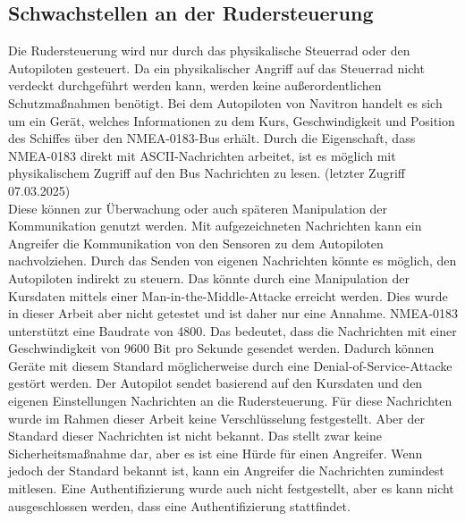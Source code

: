 \subsection{Schwachstellen an der Rudersteuerung}
Die Rudersteuerung wird nur durch das physikalische Steuerrad oder den Autopiloten gesteuert. Da ein physikalischer
Angriff auf das Steuerrad nicht verdeckt durchgeführt werden kann, werden keine außerordentlichen Schutzmaßnahmen benötigt.
Bei dem Autopiloten von Navitron handelt es sich um ein Gerät, welches Informationen zu dem Kurs, Geschwindigkeit und
Position des Schiffes über den NMEA-0183-Bus erhält. Durch die Eigenschaft, dass NMEA-0183 direkt mit ASCII-Nachrichten
arbeitet, ist es möglich mit physikalischem Zugriff auf den Bus Nachrichten zu lesen. \cite{nmea0183} (letzter Zugriff 07.03.2025) \\
Diese können zur Überwachung oder auch späteren Manipulation der Kommunikation genutzt werden. Mit aufgezeichneten Nachrichten
kann ein Angreifer die Kommunikation von den Sensoren zu dem Autopiloten nachvolziehen. Durch das Senden von eigenen Nachrichten
könnte es möglich, den Autopiloten indirekt zu steuern. Das könnte durch eine Manipulation der Kursdaten mittels einer Man-in-the-Middle-Attacke
erreicht werden. Dies wurde in dieser Arbeit aber nicht getestet und ist daher nur eine Annahme. 
NMEA-0183 unterstützt eine Baudrate von 4800. Das bedeutet, dass die Nachrichten mit einer Geschwindigkeit von 9600 Bit pro Sekunde
gesendet werden. Dadurch können Geräte mit diesem Standard möglicherweise durch eine Denial-of-Service-Attacke gestört werden.
\cite{Tran2021}
Der Autopilot sendet basierend auf den Kursdaten und den eigenen Einstellungen Nachrichten an die Rudersteuerung. Für diese 
Nachrichten wurde im Rahmen dieser Arbeit keine Verschlüsselung festgestellt. Aber der Standard dieser Nachrichten ist nicht
bekannt. Das stellt zwar keine Sicherheitsmaßnahme dar, aber es ist eine Hürde für einen Angreifer. Wenn jedoch 
der Standard bekannt ist, kann ein Angreifer die Nachrichten zumindest mitlesen. Eine Authentifizierung wurde auch
nicht festgestellt, aber es kann nicht ausgeschlossen werden, dass eine Authentifizierung stattfindet.\\

